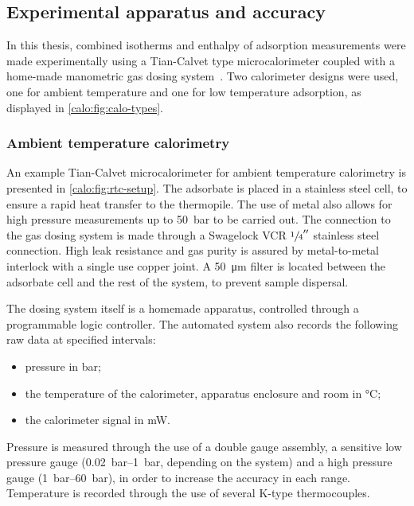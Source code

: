 \subsection{Experimental apparatus and accuracy}

In this thesis, combined isotherms and enthalpy of adsorption
measurements were made experimentally using a Tian-Calvet type
microcalorimeter coupled with a home-made manometric gas dosing
system~\cite{llewellynGasAdsorptionMicrocalorimetry2005}.
Two calorimeter designs were used, one for ambient temperature
and one for low temperature adsorption, as displayed in
\autoref{calo:fig:calo-types}.

\subsubsection{Ambient temperature calorimetry}\label{calo:rtc}

An example Tian-Calvet microcalorimeter for ambient temperature 
calorimetry is presented in \autoref{calo:fig:rtc-setup}. The 
adsorbate is placed in a stainless steel cell, to ensure a rapid 
heat transfer to the thermopile. The use of metal also allows for 
high pressure measurements up to \SI{50}{\bar} to be carried out.
The connection to the gas dosing system is made through a 
Swagelock VCR \(\sfrac{1}{4}''\)
stainless steel connection. High leak resistance and gas purity 
is assured by metal-to-metal interlock with a single use copper joint.
A \SI{50}{\micro\metre} filter is located between the adsorbate cell 
and the rest of the system, to prevent sample dispersal.

The dosing system itself is a homemade apparatus, controlled through 
a programmable logic controller. The automated system also records 
the following raw data at specified intervals:
\begin{itemize}
	\item pressure in \si{bar};
	\item the temperature of the calorimeter, apparatus enclosure and room in \si{\degreeCelsius};
	\item the calorimeter signal in \si{\milli\watt}.
\end{itemize}
Pressure is measured through the use of a double gauge assembly,
a sensitive low pressure gauge (\SIrange{0.02}{1}{\bar},
depending on the system) and a high pressure gauge (\SIrange{1}{60}{\bar}),
in order to increase the accuracy in each range. Temperature is
recorded through the use of several K-type thermocouples.

